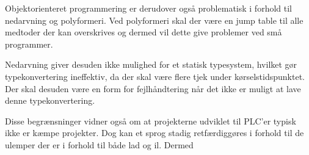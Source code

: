 Objektorienteret programmering er derudover også problematisk i forhold til nedarvning og polyformeri. Ved polyformeri skal der være en jump table til alle medtoder der kan overskrives og dermed vil dette give problemer ved små programmer.

Nedarvning giver desuden ikke mulighed for et statisk typesystem, hvilket gør typekonvertering ineffektiv, da der skal være flere tjek under kørselstidspunktet. Der skal desuden være en form for fejlhåndtering når det ikke er muligt at lave denne typekonvertering.

Disse begrænsninger vidner også om at projekterne udviklet til PLC'er typisk ikke er kæmpe projekter. Dog kan et sprog stadig retfærdiggøres i forhold til de ulemper der er i forhold til både \gls{lad} og \gls{il}. Dermed 






